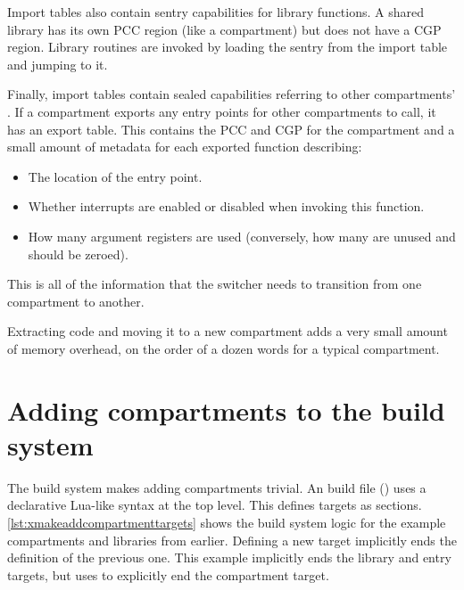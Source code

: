 Import tables also contain sentry capabilities for library functions.
A shared library has its own PCC region (like a compartment) but does not have a CGP region.
Library routines are invoked by loading the sentry from the import table and jumping to it.

Finally, import tables contain sealed capabilities referring to other compartments' .
If a compartment exports any entry points for other compartments to call, it has an export table.
This contains the PCC and CGP for the compartment and a small amount of metadata for each exported function describing:

\begin{itemize}
	\item{The location of the entry point.}
	\item{Whether interrupts are enabled or disabled when invoking this function.}
	\item{How many argument registers are used (conversely, how many are unused and should be zeroed).}
\end{itemize}


This is all of the information that the switcher needs to transition from one compartment to another.

Extracting code and moving it to a new compartment adds a very small amount of memory overhead, on the order of a dozen words for a typical compartment.

\section{Adding compartments to the build system}

The build system makes adding compartments trivial.
An  build file () uses a declarative Lua-like syntax at the top level.
This defines targets as sections.
\ref{lst:xmakeaddcompartmenttargets} shows the build system logic for the example compartments and libraries from earlier.
Defining a new target implicitly ends the definition of the previous one.
This example implicitly ends the library and entry targets, but uses  to explicitly end the compartment target.

\lualisting[filename=examples/library_or_compartment/xmake.lua,marker=compartments_and_libraries,label=lst:xmakeaddcompartmenttargets,caption="Build system code for defining compartment and library targets"]{}

